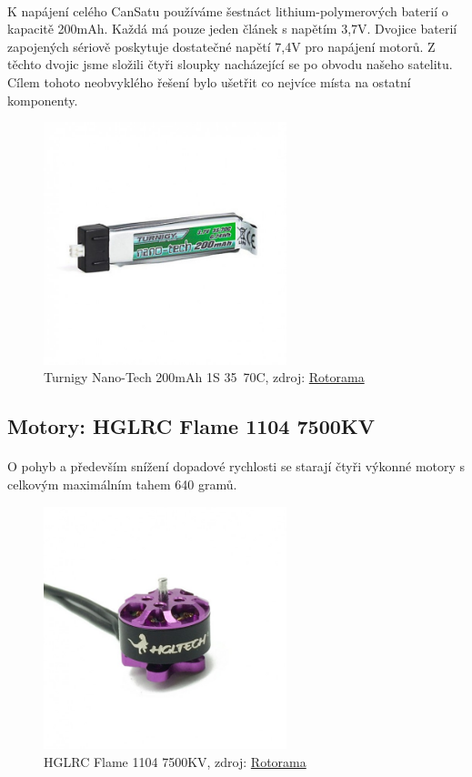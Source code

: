 \documentclass[a4paper]{report}
\begin{document}
\paragraph{} K napájení celého CanSatu používáme šestnáct lithium-polymerových baterií o kapacitě 200mAh.  Každá má pouze jeden článek s napětím 3,7V. Dvojice baterií zapojených sériově poskytuje dostatečné napětí 7,4V pro napájení motorů. Z těchto dvojic jsme složili čtyři sloupky nacházející se po obvodu našeho satelitu. Cílem tohoto neobvyklého řešení bylo ušetřit co nejvíce místa na ostatní komponenty.
\begin{figure}[H]
\centering
\caption{Turnigy Nano-Tech 200mAh 1S 35~70C, zdroj: 
\href{https://www.rotorama.cz/baterie/turnigy-nano-tech-200mah-1s-35-70c}{Rotorama}}
\includegraphics[width=200pt]{Baterie.jpg}
\end{figure}
\subsection{Motory: HGLRC Flame 1104 7500KV}
\paragraph{} O pohyb a především snížení dopadové rychlosti se starají čtyři výkonné motory s celkovým maximálním tahem 640 gramů.
\begin{figure}[H]
\centering
\caption{HGLRC Flame 1104 7500KV, zdroj: 
\href{https://www.rotorama.cz/motory/hglrc-flame-1104-7500kv}{Rotorama}}
\includegraphics[width=200pt]{Motor.jpg}
\end{figure}
\end{document}
